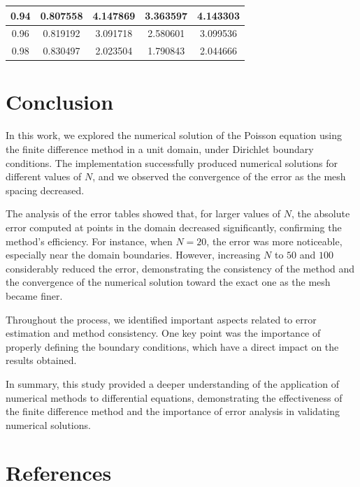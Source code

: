 \documentclass[aps,amsmath,amssymb,floatfix]{revtex4}
\begin{document}
\begin{enumerate}
\begin{enumerate}
\begin{table}[H]
\begin{tabular}{|c|c|c|c|c|}
	      	      		0.94         & 0.807558            & 4.147869            & 3.363597            & 4.143303            \\ \hline
	      	      		0.96         & 0.819192            & 3.091718            & 2.580601            & 3.099536            \\ \hline
	      	      		0.98         & 0.830497            & 2.023504            & 1.790843            & 2.044666            \\ \hline
	      	      	\end{tabular}
	      	      \end{table}
	      \end{enumerate}
\end{enumerate}

\section{Conclusion}

In this work, we explored the numerical solution of the Poisson equation using the finite difference method in a unit domain, under Dirichlet boundary conditions. The implementation successfully produced numerical solutions for different values of $N$, and we observed the convergence of the error as the mesh spacing decreased.

The analysis of the error tables showed that, for larger values of $N$, the absolute error computed at points in the domain decreased significantly, confirming the method’s efficiency. For instance, when $N = 20$, the error was more noticeable, especially near the domain boundaries. However, increasing $N$ to $50$ and $100$ considerably reduced the error, demonstrating the consistency of the method and the convergence of the numerical solution toward the exact one as the mesh became finer.

Throughout the process, we identified important aspects related to error estimation and method consistency. One key point was the importance of properly defining the boundary conditions, which have a direct impact on the results obtained.

In summary, this study provided a deeper understanding of the application of numerical methods to differential equations, demonstrating the effectiveness of the finite difference method and the importance of error analysis in validating numerical solutions.

\renewcommand{\bibsection}{}

\section{References}
\nocite{*}


\end{document}
